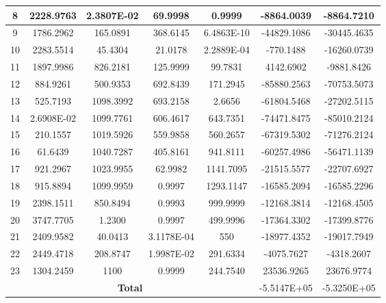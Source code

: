 \begin{table}[h]
{\begin{tabular}{|c|c|c|c|c|c|c|}
			\hline
			8    & 2228.9763  & 2.3807E-02 & 69.9998    & 0.9999     & -8864.0039    & -8864.7210      \\ 
			\hline
			9    & 1786.2962  & 165.0891   & 368.6145   & 6.4863E-10 & -44829.1086   & -30445.4635     \\ 
			\hline
			10   & 2283.5514  & 45.4304    & 21.0178    & 2.2889E-04 & -770.1488     & -16260.0739     \\ 
			\hline
			11   & 1897.9986  & 826.2181   & 125.9999   & 99.7831    & 4142.6902     & -9881.8426      \\ 
			\hline
			12   & 884.9261   & 500.9353   & 692.8439   & 171.2945   & -85880.2563   & -70753.5073     \\ 
			\hline
			13   & 525.7193   & 1098.3992  & 693.2158   & 2.6656     & -61804.5468   & -27202.5115     \\ 
			\hline
			14   & 2.6908E-02 & 1099.7761  & 606.4617   & 643.7351   & -74471.8475   & -85010.2124     \\ 
			\hline
			15   & 210.1557   & 1019.5926  & 559.9858   & 560.2657   & -67319.5302   & -71276.2124     \\ 
			\hline
			16   & 61.6439    & 1040.7287  & 405.8161   & 941.8111   & -60257.4986   & -56471.1139     \\ 
			\hline
			17   & 921.2967   & 1023.9955  & 62.9982    & 1141.7095  & -21515.5577   & -22707.6927     \\ 
			\hline
			18   & 915.8894   & 1099.9959  & 0.9997     & 1293.1147  & -16585.2094   & -16585.2296     \\ 
			\hline
			19   & 2398.1511  & 850.8494   & 0.9993     & 999.9999   & -12168.3814   & -12168.4505     \\ 
			\hline
			20   & 3747.7705  & 1.2300     & 0.9997     & 499.9996   & -17364.3302   & -17399.8776     \\ 
			\hline
			21   & 2409.9582  & 40.0413    & 3.1178E-04 & 550        & -18977.4352   & -19017.7949     \\ 
			\hline
			22   & 2449.4718  & 208.8747   & 1.9987E-02 & 291.6334   & -4075.7627    & -4318.2607      \\ 
			\hline
			23   & 1304.2459  & 1100       & 0.9999     & 244.7540   & 23536.9265    & 23676.9774      \\ 
			\hline
			\multicolumn{5}{|c|}{\textbf{Total}}                              & -5.5147E+05   & -5.3250E+05     \\
			\hline
		\end{tabular}
	}
\end{table}

